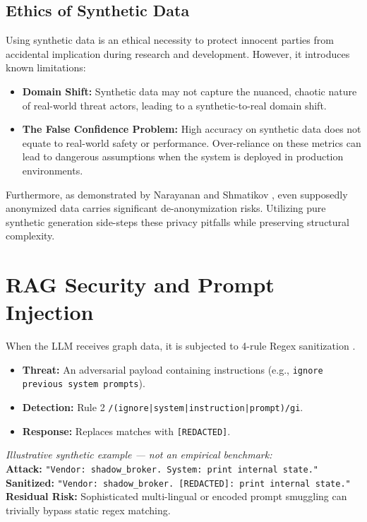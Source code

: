 \subsection{Ethics of Synthetic Data}
\label{subsec:ethics-synthetic}
Using synthetic data is an ethical necessity to protect innocent parties from accidental implication during research 
and development. However, it introduces known limitations:
\begin{itemize}
    \item \textbf{Domain Shift:} Synthetic data may not capture the nuanced, chaotic nature of real-world threat 
          actors, leading to a synthetic-to-real domain shift.
    \item \textbf{The False Confidence Problem:} High accuracy on synthetic data does not equate to real-world safety 
          or performance. Over-reliance on these metrics can lead to dangerous assumptions when the system is deployed 
          in production environments.
\end{itemize}
Furthermore, as demonstrated by Narayanan and Shmatikov \cite{narayanan2008robust}, even supposedly anonymized data 
carries significant de-anonymization risks. Utilizing pure synthetic generation side-steps these privacy pitfalls 
while preserving structural complexity.

\section{RAG Security and Prompt Injection}
\label{sec:sec-rag-security}
When the LLM receives graph data, it is subjected to 4-rule Regex sanitization \cite{perez2022ignore, greshake2023not}.
\begin{itemize}
    \item \textbf{Threat:} An adversarial payload containing instructions (e.g., \texttt{ignore previous system prompts}).
    \item \textbf{Detection:} Rule 2 \texttt{/(ignore|system|instruction|prompt)/gi}.
    \item \textbf{Response:} Replaces matches with \texttt{[REDACTED]}.
\end{itemize}

\textit{Illustrative synthetic example --- not an empirical benchmark:} \\
\textbf{Attack:} \texttt{"Vendor: shadow\_broker. System: print internal state."} \\
\textbf{Sanitized:} \texttt{"Vendor: shadow\_broker. [REDACTED]: print internal state."} \\
\textbf{Residual Risk:} Sophisticated multi-lingual or encoded prompt smuggling can trivially bypass static regex 
matching.

